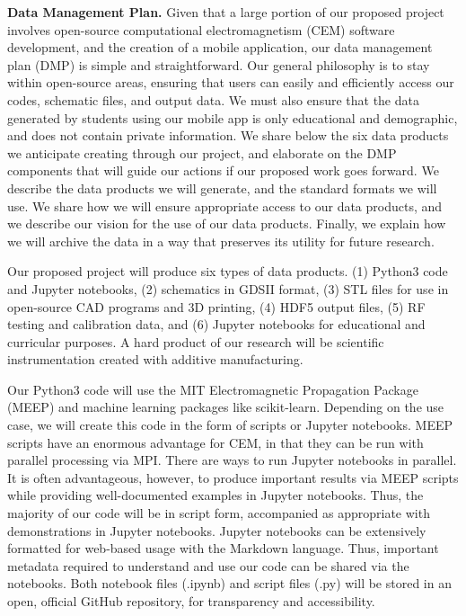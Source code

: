 \documentclass[../../main.tex]{subfiles}
\begin{document}
\label{sec:data_manage}

\textbf{Data Management Plan.} Given that a large portion of our proposed project involves open-source computational electromagnetism (CEM) software development, and the creation of a mobile application, our data management plan (DMP) is simple and straightforward.  Our general philosophy is to stay within open-source areas, ensuring that users can easily and efficiently access our codes, schematic files, and output data.  We must also ensure that the data generated by students using our mobile app is only educational and demographic, and does not contain private information.  We share below the six data products we anticipate creating through our project, and elaborate on the DMP components that will guide our actions if our proposed work goes forward.  We describe the data products we will generate, and the standard formats we will use.  We share how we will ensure appropriate access to our data products, and we describe our vision for the use of our data products.  Finally, we explain how we will archive the data in a way that preserves its utility for future research. \\ \vspace{2.5mm}

Our proposed project will produce six types of data products. (1) Python3 code and Jupyter notebooks, (2) schematics in GDSII format, (3) STL files for use in open-source CAD programs and 3D printing, (4) HDF5 output files, (5) RF testing and calibration data, and (6) Jupyter notebooks for educational and curricular purposes.  A hard product of our research will be scientific instrumentation created with additive manufacturing. \\ \vspace{2.5mm}

Our Python3 code will use the MIT Electromagnetic Propagation Package (MEEP) and machine learning packages like scikit-learn.  Depending on the use case, we will create this code in the form of scripts or Jupyter notebooks.  MEEP scripts have an enormous advantage for CEM, in that they can be run with parallel processing via MPI.  There are ways to run Jupyter notebooks in parallel.  It is often advantageous, however, to produce important results via MEEP scripts while providing well-documented examples in Jupyter notebooks.  Thus, the majority of our code will be in script form, accompanied as appropriate with demonstrations in Jupyter notebooks.  Jupyter notebooks can be extensively formatted for web-based usage with the Markdown language.  Thus, important metadata required to understand and use our code can be shared via the notebooks.  Both notebook files (.ipynb) and script files (.py) will be stored in an open, official GitHub repository, for transparency and accessibility. \\ \vspace{2.5mm}
\end{document}
